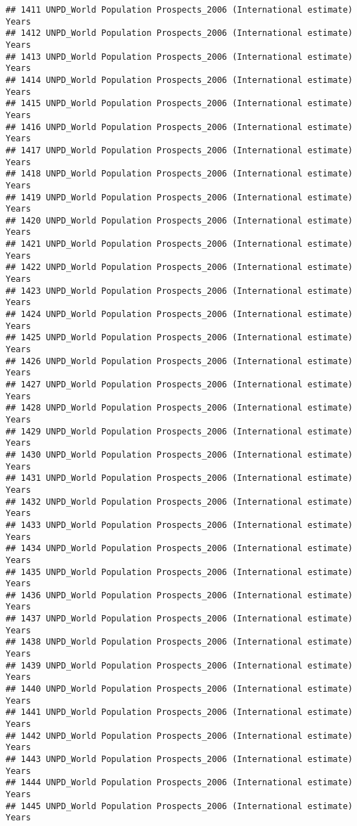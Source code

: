 \documentclass[]{article}
\begin{document}
\begin{verbatim}
## 1411 UNPD_World Population Prospects_2006 (International estimate) Years
## 1412 UNPD_World Population Prospects_2006 (International estimate) Years
## 1413 UNPD_World Population Prospects_2006 (International estimate) Years
## 1414 UNPD_World Population Prospects_2006 (International estimate) Years
## 1415 UNPD_World Population Prospects_2006 (International estimate) Years
## 1416 UNPD_World Population Prospects_2006 (International estimate) Years
## 1417 UNPD_World Population Prospects_2006 (International estimate) Years
## 1418 UNPD_World Population Prospects_2006 (International estimate) Years
## 1419 UNPD_World Population Prospects_2006 (International estimate) Years
## 1420 UNPD_World Population Prospects_2006 (International estimate) Years
## 1421 UNPD_World Population Prospects_2006 (International estimate) Years
## 1422 UNPD_World Population Prospects_2006 (International estimate) Years
## 1423 UNPD_World Population Prospects_2006 (International estimate) Years
## 1424 UNPD_World Population Prospects_2006 (International estimate) Years
## 1425 UNPD_World Population Prospects_2006 (International estimate) Years
## 1426 UNPD_World Population Prospects_2006 (International estimate) Years
## 1427 UNPD_World Population Prospects_2006 (International estimate) Years
## 1428 UNPD_World Population Prospects_2006 (International estimate) Years
## 1429 UNPD_World Population Prospects_2006 (International estimate) Years
## 1430 UNPD_World Population Prospects_2006 (International estimate) Years
## 1431 UNPD_World Population Prospects_2006 (International estimate) Years
## 1432 UNPD_World Population Prospects_2006 (International estimate) Years
## 1433 UNPD_World Population Prospects_2006 (International estimate) Years
## 1434 UNPD_World Population Prospects_2006 (International estimate) Years
## 1435 UNPD_World Population Prospects_2006 (International estimate) Years
## 1436 UNPD_World Population Prospects_2006 (International estimate) Years
## 1437 UNPD_World Population Prospects_2006 (International estimate) Years
## 1438 UNPD_World Population Prospects_2006 (International estimate) Years
## 1439 UNPD_World Population Prospects_2006 (International estimate) Years
## 1440 UNPD_World Population Prospects_2006 (International estimate) Years
## 1441 UNPD_World Population Prospects_2006 (International estimate) Years
## 1442 UNPD_World Population Prospects_2006 (International estimate) Years
## 1443 UNPD_World Population Prospects_2006 (International estimate) Years
## 1444 UNPD_World Population Prospects_2006 (International estimate) Years
## 1445 UNPD_World Population Prospects_2006 (International estimate) Years

\end{verbatim}
\end{document}
